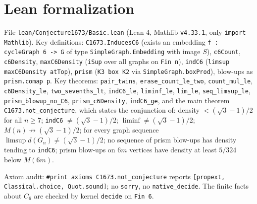 \documentclass[11pt]{article}
\theoremstyle{definition}
\begin{document}
\section*{Lean formalization}
File \texttt{lean/Conjecture1673/Basic.lean} (Lean 4, Mathlib \texttt{v4.33.1}, only \texttt{import Mathlib}).
Key definitions: \texttt{C1673.InducesC6} (exists an embedding \texttt{f : cycleGraph 6 -> G} of type \texttt{SimpleGraph.Embedding} with image $S$),
\texttt{c6Count}, \texttt{c6Density}, \texttt{maxC6Density} (\texttt{iSup} over all graphs on \texttt{Fin n}),
\texttt{indC6} (\texttt{limsup maxC6Density atTop}), \texttt{prism} (\texttt{K3 box K2} via \texttt{SimpleGraph.boxProd}),
blow-ups as \texttt{prism.comap p}.
Key theorems: \texttt{pair\_twins}, \texttt{erase\_count\_le\_two}, \texttt{count\_mul\_le},
\texttt{c6Density\_le}, \texttt{two\_sevenths\_lt}, \texttt{indC6\_le}, \texttt{liminf\_le}, \texttt{lim\_le},
\texttt{seq\_limsup\_le}, \texttt{prism\_blowup\_no\_C6}, \texttt{prism\_c6Density}, \texttt{indC6\_ge}, and the
main theorem \texttt{C1673.not\_conjecture}, which states the conjunction of: density $<(\sqrt3-1)/2$ for all
$n\ge7$; \texttt{indC6} $\ne(\sqrt3-1)/2$; $\liminf \ne (\sqrt3-1)/2$; $M(n) \not\to (\sqrt3-1)/2$; for every graph
sequence $\limsup d(G_n) \ne (\sqrt3-1)/2$; no sequence of prism blow-ups has density tending to \texttt{indC6};
prism blow-ups on $6m$ vertices have density at least $5/324$ below $M(6m)$.

Axiom audit: \texttt{\#print axioms C1673.not\_conjecture} reports
\texttt{[propext, Classical.choice, Quot.sound]}; no \texttt{sorry}, no \texttt{native\_decide}. The finite
facts about $C_6$ are checked by kernel \texttt{decide} on \texttt{Fin 6}.
\end{document}
